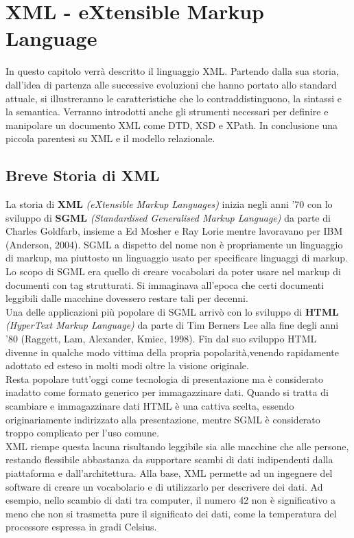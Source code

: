 \chapter{XML - eXtensible Markup Language}
In questo capitolo verrà descritto il linguaggio XML. Partendo dalla sua storia, dall'idea di partenza alle successive evoluzioni che hanno portato allo standard attuale, si illustreranno le caratteristiche che lo contraddistinguono, la sintassi e la semantica. Verranno introdotti anche gli strumenti necessari per definire e manipolare un documento XML come DTD, XSD e XPath. In conclusione una piccola parentesi su XML e il modello relazionale.

\section{Breve Storia di XML}
La storia di \textbf{XML} \emph{(eXtensible Markup Languages)} inizia negli anni '70 con lo sviluppo di \textbf{SGML} \emph{(Standardised Generalised Markup Language)} da parte di  Charles Goldfarb, insieme a Ed Mosher e Ray Lorie mentre lavoravano per IBM (Anderson, 2004). SGML a dispetto del nome non è propriamente un linguaggio di markup, ma piuttosto un linguaggio usato per specificare linguaggi di markup. Lo scopo di SGML era quello di creare vocabolari da poter usare nel markup di documenti con tag strutturati. Si immaginava all'epoca che certi documenti leggibili dalle macchine dovessero restare tali per decenni.
\\
Una delle applicazioni più popolare di SGML arrivò con lo sviluppo di \textbf{HTML} \emph{(HyperText Markup Language)} da parte di Tim Berners Lee alla fine degli anni '80 (Raggett, Lam, Alexander, Kmiec, 1998). Fin dal suo sviluppo HTML divenne in qualche modo vittima della propria popolarità,venendo rapidamente adottato ed esteso in molti modi oltre la visione originale.\\ Resta popolare tutt'oggi come tecnologia di presentazione ma è considerato inadatto come formato generico per immagazzinare dati. Quando si tratta di scambiare e immagazzinare dati HTML è una cattiva scelta, essendo originariamente indirizzato alla presentazione, mentre SGML è considerato troppo complicato per l'uso comune.
\\
XML riempe questa lacuna risultando leggibile sia alle macchine che alle persone, restando flessibile abbastanza da supportare scambi di dati indipendenti dalla piattaforma e dall'architettura.
Alla base, XML permette ad un ingegnere del software di creare un vocabolario e di utilizzarlo per descrivere dei dati. Ad esempio, nello scambio di dati tra computer, il numero 42 non è significativo a meno che non si trasmetta pure il significato dei dati, come la temperatura del processore espressa in gradi Celsius.
